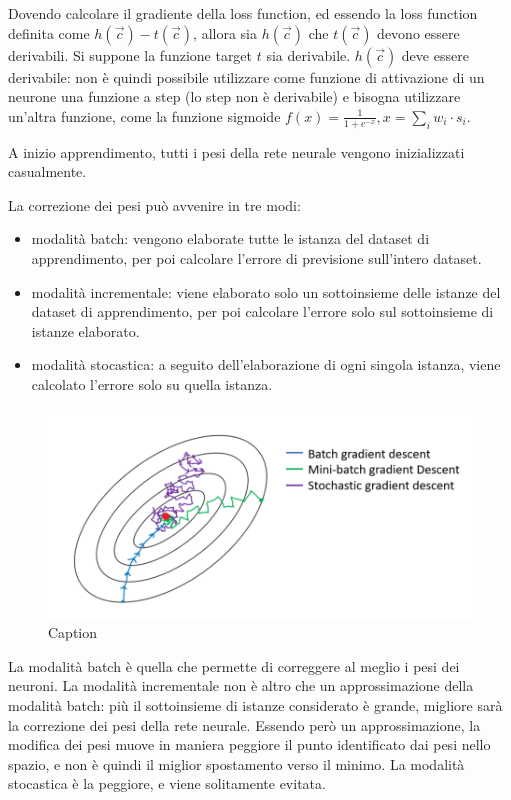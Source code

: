 Dovendo calcolare il gradiente della loss function, ed essendo la loss function definita come $h(\Vec{c}) - t(\Vec{c})$, allora sia $h(\Vec{c})$ che $t(\Vec{c})$ devono essere derivabili. Si suppone la funzione target $t$ sia derivabile. $h(\Vec{c})$ deve essere derivabile: non è quindi possibile utilizzare come funzione di attivazione di un neurone una funzione a step (lo step non è derivabile) e bisogna utilizzare un'altra funzione, come la funzione sigmoide $f(x) = \frac{1}{1+e^{-x}}, x = \sum_i w_i \cdot s_i$.

A inizio apprendimento, tutti i pesi della rete neurale vengono inizializzati casualmente.

La correzione dei pesi può avvenire in tre modi:
\begin{itemize}
    \item modalità batch: vengono elaborate tutte le istanza del dataset di apprendimento, per poi calcolare l'errore di previsione sull'intero dataset.
    \item modalità incrementale: viene elaborato solo un sottoinsieme delle istanze del dataset di apprendimento, per poi calcolare l'errore solo sul sottoinsieme di istanze elaborato.
    \item modalità stocastica: a seguito dell'elaborazione di ogni singola istanza, viene calcolato l'errore solo su quella istanza.
\end{itemize}
\begin{figure}
    \centering
    \includegraphics[width=0.75\linewidth]{img/gradient_descent.png}
    \caption{Caption}
    \label{fig:gradient_descent}
\end{figure}
La modalità batch è quella che permette di correggere al meglio i pesi dei neuroni. La modalità incrementale non è altro che un approssimazione della modalità batch: più il sottoinsieme di istanze considerato è grande, migliore sarà la correzione dei pesi della rete neurale. Essendo però un approssimazione, la modifica dei pesi muove in maniera peggiore il punto identificato dai pesi nello spazio, e non è quindi il miglior spostamento verso il minimo.
La modalità stocastica è la peggiore, e viene solitamente evitata.

